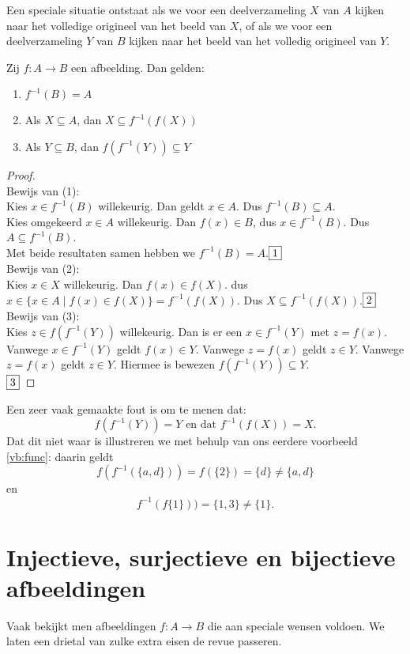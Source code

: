 Een speciale situatie ontstaat als we voor een deelverzameling $X$ van $A$ kijken naar het volledige origineel van het beeld van $X$, of als we voor een deelverzameling $Y$ van $B$ kijken naar het beeld van het volledig origineel van $Y$.
\begin{theorem}\label{st:afb}
Zij $f:A\rightarrow B$ een afbeelding. Dan gelden:
\begin{enumerate}
    \item $f^{-1}(B)=A$
    \item Als $X\subseteq A$, dan $X\subseteq f^{-1}(f(X))$
    \item Als $Y\subseteq B$, dan $f(f^{-1}(Y))\subseteq Y$
\end{enumerate}
\end{theorem}
\begin{proof}\mbox{}\\

Bewijs van (1):\\[1.5pt]
Kies $x\in f^{-1}(B)$ willekeurig. Dan geldt $x\in A$. Dus $f^{-1}(B)\subseteq A$.\\[1.5pt]
Kies omgekeerd $x\in A$ willekeurig. Dan $f(x)\in B$, dus $x\in f^{-1}(B)$. Dus $A\subseteq f^{-1}(B)$.\\[1.5pt]
Met beide resultaten samen hebben we $f^{-1}(B)=A$.\hfill$\fbox{1}$\\[2.5pt]
Bewijs van (2):\\[1.5pt]
Kies $x\in X$ willekeurig. Dan $f(x)\in f(X)$. dus $x\in\{x\in A\;|\;f(x)\in f(X)\} = f^{-1}(f(X))$. Dus $X\subseteq f^{-1}(f(X))$.\hfill$\fbox{2}$\\[2.5pt]
Bewijs van (3):\\[1.5pt]
Kies $z\in f(f^{-1}(Y))$ willekeurig. Dan is er een $x\in f^{-1}(Y)$ met $z=f(x)$. Vanwege $x\in f^{-1}(Y)$ geldt $f(x)\in Y$. Vanwege $z=f(x)$ geldt $z\in Y$. Vanwege $z=f(x)$ geldt $z\in Y$. Hiermee is bewezen $f(f^{-1}(Y))\subseteq Y$.\\ \mbox{}\hfill$\fbox{3}$
\end{proof}

Een zeer vaak gemaakte fout is om te menen dat:
$$f(f^{-1}(Y)) = Y\text{ en dat } f^{-1}(f(X)) = X.$$
Dat dit niet waar is illustreren we met behulp van ons eerdere voorbeeld \ref{vb:func}: daarin geldt
$$f(f^{-1}(\{a,d\})) = f(\{2\}) = \{d\}\not = \{a,d\}$$
en
$$f^{-1}(f\{1\})) = \{1, 3\}\not=\{1\}.$$

\section{Injectieve, surjectieve en bijectieve afbeeldingen}
Vaak bekijkt men afbeeldingen $f:A\rightarrow B$ die aan speciale wensen voldoen. We laten een drietal van zulke extra eisen de revue passeren.

